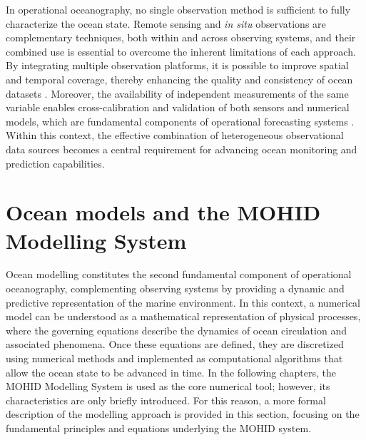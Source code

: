 In operational oceanography, no single observation method is sufficient to fully characterize the ocean state. Remote sensing and \emph{in situ} observations are complementary techniques, both within and across observing systems, and their combined use is essential to overcome the inherent limitations of each approach. By integrating multiple observation platforms, it is possible to improve spatial and temporal coverage, thereby enhancing the quality and consistency of ocean datasets \parencite{lin2020ocean}. Moreover, the availability of independent measurements of the same variable enables cross-calibration and validation of both sensors and numerical models, which are fundamental components of operational forecasting systems \parencite{schiller2018overview}. Within this context, the effective combination of heterogeneous observational data sources becomes a central requirement for advancing ocean monitoring and prediction capabilities.

\section{Ocean models and the MOHID\\Modelling System}
Ocean modelling constitutes the second fundamental component of operational oceanography, complementing observing systems by providing a dynamic and predictive representation of the marine environment. In this context, a numerical model can be understood as a mathematical representation of physical processes, where the governing equations describe the dynamics of ocean circulation and associated phenomena. Once these equations are defined, they are discretized using numerical methods and implemented as computational algorithms that allow the ocean state to be advanced in time. In the following chapters, the MOHID Modelling System is used as the core numerical tool; however, its characteristics are only briefly introduced. For this reason, a more formal description of the modelling approach is provided in this section, focusing on the fundamental principles and equations underlying the MOHID system.

